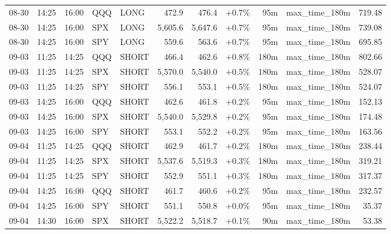 \documentclass[11pt,a4paper,twoside]{article}
\begin{document}
\begin{center}
\begin{longtable}{>{\color{txtmain}}l l l l l r r r r >{\color{txtmain}}l r}
08-30 & 14:25 & 16:00 & QQQ & LONG & 472.9 & 476.4 & \textcolor{wingreen}{+0.7\%} & 95m & max\_time\_180m & \textcolor{wingreen}{719.48} \\
08-30 & 14:25 & 16:00 & SPX & LONG & 5,605.6 & 5,647.6 & \textcolor{wingreen}{+0.7\%} & 95m & max\_time\_180m & \textcolor{wingreen}{739.08} \\
08-30 & 14:25 & 16:00 & SPY & LONG & 559.6 & 563.6 & \textcolor{wingreen}{+0.7\%} & 95m & max\_time\_180m & \textcolor{wingreen}{695.85} \\
09-03 & 11:25 & 14:25 & QQQ & SHORT & 466.4 & 462.6 & \textcolor{wingreen}{+0.8\%} & 180m & max\_time\_180m & \textcolor{wingreen}{802.66} \\
09-03 & 11:25 & 14:25 & SPX & SHORT & 5,570.0 & 5,540.0 & \textcolor{wingreen}{+0.5\%} & 180m & max\_time\_180m & \textcolor{wingreen}{528.07} \\
09-03 & 11:25 & 14:25 & SPY & SHORT & 556.1 & 553.1 & \textcolor{wingreen}{+0.5\%} & 180m & max\_time\_180m & \textcolor{wingreen}{524.07} \\
09-03 & 14:25 & 16:00 & QQQ & SHORT & 462.6 & 461.8 & \textcolor{wingreen}{+0.2\%} & 95m & max\_time\_180m & \textcolor{wingreen}{152.13} \\
09-03 & 14:25 & 16:00 & SPX & SHORT & 5,540.0 & 5,529.8 & \textcolor{wingreen}{+0.2\%} & 95m & max\_time\_180m & \textcolor{wingreen}{174.48} \\
09-03 & 14:25 & 16:00 & SPY & SHORT & 553.1 & 552.2 & \textcolor{wingreen}{+0.2\%} & 95m & max\_time\_180m & \textcolor{wingreen}{163.56} \\
09-04 & 11:25 & 14:25 & QQQ & SHORT & 462.9 & 461.7 & \textcolor{wingreen}{+0.2\%} & 180m & max\_time\_180m & \textcolor{wingreen}{238.44} \\
09-04 & 11:25 & 14:25 & SPX & SHORT & 5,537.6 & 5,519.3 & \textcolor{wingreen}{+0.3\%} & 180m & max\_time\_180m & \textcolor{wingreen}{319.21} \\
09-04 & 11:25 & 14:25 & SPY & SHORT & 552.9 & 551.1 & \textcolor{wingreen}{+0.3\%} & 180m & max\_time\_180m & \textcolor{wingreen}{317.37} \\
09-04 & 14:25 & 16:00 & QQQ & SHORT & 461.7 & 460.6 & \textcolor{wingreen}{+0.2\%} & 95m & max\_time\_180m & \textcolor{wingreen}{232.57} \\
09-04 & 14:25 & 16:00 & SPY & SHORT & 551.1 & 550.8 & \textcolor{wingreen}{+0.0\%} & 95m & max\_time\_180m & \textcolor{wingreen}{35.37} \\
09-04 & 14:30 & 16:00 & SPX & SHORT & 5,522.2 & 5,518.7 & \textcolor{wingreen}{+0.1\%} & 90m & max\_time\_180m & \textcolor{wingreen}{53.38} \\

\end{longtable}
\end{center}
\end{document}
